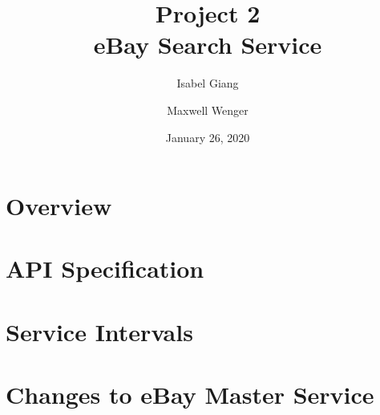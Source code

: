 \documentclass[12pt,a4paper]{article}
\title{Project 2 \\ eBay Search Service}
\author{Isabel Giang}
\author{Maxwell Wenger}
\affil{CSS490 Group Y4}
\date{January 26, 2020}
\begin{document}
\maketitle
\tableofcontents



\section{Overview}



\section{API Specification}

\section{Service Intervals}

\section{Changes to eBay Master Service}
\end{document}
